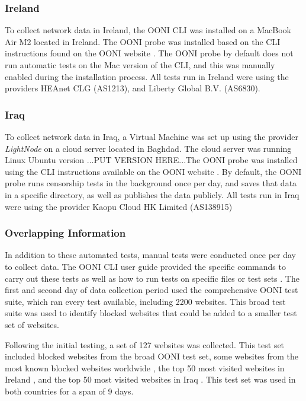\subsubsection{Ireland}

To collect network data in Ireland, the OONI CLI was installed on a MacBook Air M2 located in Ireland. The OONI probe was installed based on the CLI instructions found on the OONI website \cite{OONISCLI}. The OONI probe by default does not run automatic tests on the Mac version of the CLI, and this was manually enabled during the installation process. All tests run in Ireland were using the providers HEAnet CLG (AS1213), and Liberty Global B.V. (AS6830).

\subsubsection{Iraq}

To collect network data in Iraq, a Virtual Machine was set up using the provider \textit{LightNode} \cite{lightnodeLightNodeGlobal} on a cloud server located in Baghdad. The cloud server was running Linux Ubuntu version ...PUT VERSION HERE...The OONI probe was installed using the CLI instructions available on the OONI website \cite{OONISCLI}. By default, the OONI probe runs censorship tests in the background once per day, and saves that data in a specific directory, as well as publishes the data publicly. All tests run in Iraq were using the provider Kaopu Cloud HK Limited (AS138915)

\subsubsection{Overlapping Information}

In addition to these automated tests, manual tests were conducted once per day to collect data. The OONI CLI user guide provided the specific commands to carry out these tests as well as how to run tests on specific files or test sets \cite{ooniUserGuideCLI}. The first and second day of data collection period used the comprehensive OONI test suite, which ran every test available, including 2200 websites. This broad test suite was used to identify blocked websites that could be added to a smaller test set of websites.

Following the initial testing, a set of 127 websites was collected. This test set included blocked websites from the broad OONI test set, some websites from the most known blocked websites worldwide \cite{blocksiteMostBlocked}, the top 50 most visited websites in Ireland \cite{top50irishwebsites}, and the top 50 most visited websites in Iraq \cite{top50IraqWebsites}. This test set was used in both countries for a span of 9 days.

